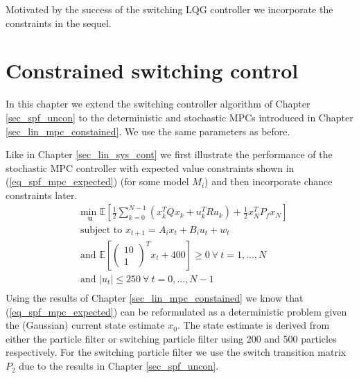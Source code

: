Motivated by the success of the switching LQG controller we incorporate the constraints in the sequel.

\section{Constrained switching control} 
In this chapter we extend the switching controller algorithm of Chapter \ref{sec_spf_uncon} to the deterministic and stochastic MPCs introduced in Chapter \ref{sec_lin_mpc_constained}. We use the same parameters as before.

Like in Chapter \ref{sec_lin_sys_cont} we first illustrate the performance of the stochastic MPC controller with expected value constraints shown in (\ref{eq_spf_mpc_expected}) (for some model $M_i$) and then incorporate chance constraints later.
\begin{equation}
\begin{aligned}
&\underset{\mathbf{u}}{\text{min }} \mathbb{E}\left[ \frac{1}{2}\sum_{k=0}^{N-1} \left( x_k^TQx_k + u_k^TRu_k \right) + \frac{1}{2}x_N^TP_fx_N \right] \\
& \text{subject to } x_{t+1}=A_ix_t+B_iu_t + w_t\\
& \text{and } \mathbb{E}[\begin{pmatrix}
10 \\ 1
\end{pmatrix}^Tx_t + 400] \geq 0 ~\forall ~t=1,...,N \\
& \text{and } |u_t| \leq 250 ~\forall ~t=0,...,N-1\\
\end{aligned}
\label{eq_spf_mpc_expected}
\end{equation} 
Using the results of Chapter \ref{sec_lin_mpc_constained} we know that (\ref{eq_spf_mpc_expected}) can be reformulated as a deterministic problem given the (Gaussian) current state estimate $x_0$. The state estimate is derived from either the particle filter or switching particle filter using 200 and 500 particles respectively. For the switching particle filter we use the switch transition matrix $P_2$ due to the results in Chapter \ref{sec_spf_uncon}.

